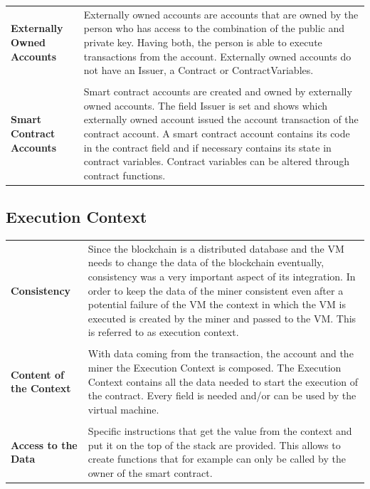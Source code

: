 \begin{tabular}[t]{ p{3cm} p{12.5cm}}
\raggedright
\textbf{Externally Owned Accounts} &
Externally owned accounts are accounts that are owned by the person who has access to the combination of the public and private key. Having both, the person is able to execute transactions from the account. Externally owned accounts do not have an Issuer, a Contract or ContractVariables. \\ \\
\textbf{Smart Contract Accounts} &
Smart contract accounts are created and owned by externally owned accounts. The field Issuer is set and shows which externally owned account issued the account transaction of the contract account. A smart contract account contains its code in the contract field and if necessary contains its state in contract variables. Contract variables can be altered through contract functions.
\end{tabular}

\subsection{Execution Context}
\begin{tabular}[t]{ p{3cm} p{12.5cm}}
\raggedright
\textbf{Consistency} &
Since the blockchain is a distributed database and the VM needs to change the data of the blockchain eventually, consistency was a very important aspect of its integration. In order to keep the data of the miner consistent even after a potential failure of the VM the context in which the VM is executed is created by the miner and passed to the VM. This is referred to as execution context. \\ \\ %

\raggedright
\textbf{Content of the Context} &
With data coming from the transaction, the account and the miner the Execution Context is composed. The Execution Context contains all the data needed to start the execution of the contract. Every field is needed and/or can be used by the virtual machine. \\ \\ 

\raggedright
\textbf{Access to the Data} &
Specific instructions that get the value from the context and put it on the top of the stack are provided. This allows to create functions that for example can only be called by the owner of the smart contract. 
\end{tabular}

